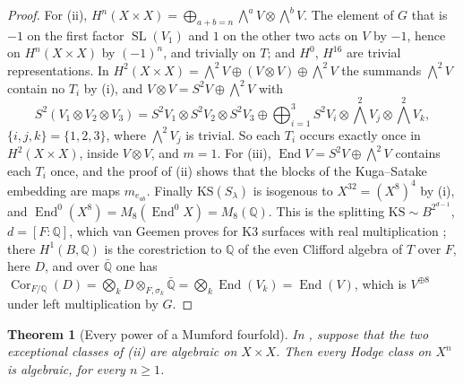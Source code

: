 \documentclass[11pt,reqno]{amsart}
\theoremstyle{plain}
\newtheorem{theorem}{Theorem}[section]
\theoremstyle{definition}
\theoremstyle{remark}
\newcommand{\QQ}{\mathbb{Q}}
\DeclareMathOperator{\End}{End}
\DeclareMathOperator{\SL}{SL}
\begin{document}
\begin{proof}
For (ii),
$H^{n}(X\times X)=\bigoplus_{a+b=n}\bigwedge^{a}V\otimes\bigwedge^{b}V$. The
element of $G$ that is $-1$ on the first factor $\SL(V_{1})$ and $1$ on the
other two acts on $V$ by $-1$, hence on $H^{n}(X\times X)$ by $(-1)^{n}$, and
trivially on $T$; and $H^{0}$, $H^{16}$ are trivial representations. In
$H^{2}(X\times X)=\bigwedge^{2}V\oplus(V\otimes V)\oplus\bigwedge^{2}V$ the
summands $\bigwedge^{2}V$ contain no $T_{i}$ by (i), and
$V\otimes V=S^{2}V\oplus\bigwedge^{2}V$ with
\[
  S^{2}(V_{1}\otimes V_{2}\otimes V_{3})
  =S^{2}V_{1}\otimes S^{2}V_{2}\otimes S^{2}V_{3}
  \oplus\bigoplus_{i=1}^{3}S^{2}V_{i}\otimes
  \textstyle\bigwedge^{2}V_{j}\otimes\bigwedge^{2}V_{k},
\]
$\{i,j,k\}=\{1,2,3\}$, where $\bigwedge^{2}V_{j}$ is trivial. So each $T_{i}$
occurs exactly once in $H^{2}(X\times X)$, inside $V\otimes V$, and $m=1$.
For (iii), $\End V=S^{2}V\oplus
\bigwedge^{2}V$ contains each $T_{i}$ once, and the proof of
(ii) shows that the blocks of the Kuga--Satake embedding
are maps $m_{e_{ab}}$. Finally $\mathrm{KS}(S_{\lambda})$ is isogenous to
$X^{32}=(X^{8})^{4}$ by (i), and
$\End^{0}(X^{8})=M_{8}(\End^{0}X)=M_{8}(\QQ)$. This is the splitting
$\mathrm{KS}\sim B^{2^{d-1}}$, $d=[F:\QQ]$, which van Geemen proves for K3
surfaces with real multiplication \cite{vG08}; there $H^{1}(B,\QQ)$ is the
corestriction to $\QQ$ of the even Clifford algebra of $T$ over $F$, here
$D$, and over $\bar{\QQ}$ one has $\operatorname{Cor}_{F/\QQ}(D)=
\bigotimes_{k}D\otimes_{F,\sigma_{k}}\bar{\QQ}=\bigotimes_{k}\End(V_{k})=
\End(V)$, which is $V^{\oplus8}$ under left multiplication by $G$.
\end{proof}

\begin{theorem}[Every power of a Mumford fourfold]\label{thm:mumfordpowers}
In , suppose that the two exceptional classes of
(ii) are algebraic on $X\times X$. Then every Hodge
class on $X^{n}$ is algebraic, for every $n\ge1$.
\end{theorem}
\end{document}
